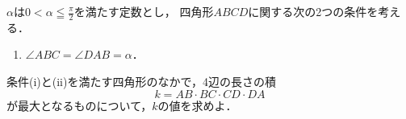 \documentclass[../../main.tex]{subfiles}
\begin{document}
$\alpha$は$\displaystyle0<\alpha\leqq\frac{\pi}{2}$を満たす定数とし，
四角形$ABCD$に関する次の2つの条件を考える．
\begin{enumerate}
  $ABCD$は半径1の円に内接する．
  \item$\angle ABC=\angle DAB=\alpha$．
\end{enumerate}
条件(i)と(ii)を満たす四角形のなかで，4辺の長さの積
\[ k=AB \cdot BC \cdot CD \cdot DA \]
が最大となるものについて，$k$の値を求めよ．
\end{document}
